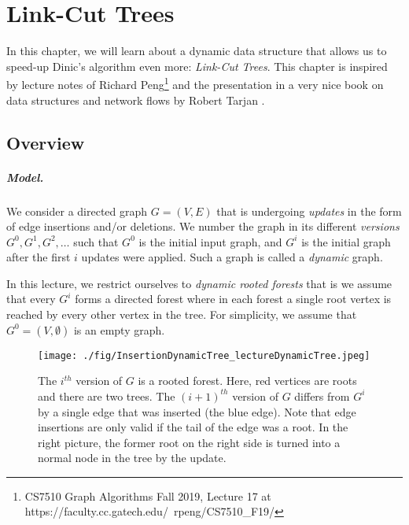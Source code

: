 \chapter{Link-Cut Trees}

In this chapter, we will learn about a dynamic data structure that allows us to speed-up Dinic's algorithm even more: \emph{Link-Cut Trees}. This chapter is inspired by lecture notes of Richard Peng\footnote{CS7510 Graph Algorithms Fall 2019, Lecture 17 at https://faculty.cc.gatech.edu/~rpeng/CS7510\_F19/} and the presentation in a very nice book on data structures and network flows by Robert Tarjan \cite{tarjan1983data}.

\section{Overview}

\paragraph{Model.} We consider a directed graph $G=(V,E)$ that is undergoing \emph{updates} in the form of edge insertions and/or deletions. We number the graph in its different \emph{versions} $G^0, G^1, G^2, \dots$ such that $G^0$ is the initial input graph, and $G^i$ is the initial graph after the first $i$ updates were applied. Such a graph is called a \emph{dynamic} graph.

In this lecture, we restrict ourselves to \emph{dynamic rooted forests} that is we assume that every $G^i$ forms a directed forest where in each forest a single root vertex is reached by every other vertex in the tree. For simplicity, we assume that $G^0 = (V, \emptyset)$ is an empty graph.

\begin{figure}[!ht]
    \centering
    \texttt{[image: ./fig/InsertionDynamicTree\_lectureDynamicTree.jpeg]}
    \caption{The $i^{th}$ version of $G$ is a rooted forest. Here, red vertices are roots and there are two trees. The $(i+1)^{th}$ version of $G$ differs from $G^i$ by a single edge that was inserted (the blue edge). Note that edge insertions are only valid if the tail of the edge was a root. In the right picture, the former root on the right side is turned into a normal node in the tree by the update.}
    \label{fig:my_label}
\end{figure}

